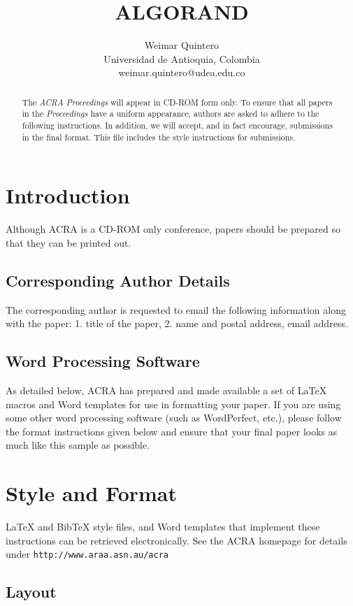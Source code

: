 \documentclass{article}
\title{ALGORAND}
\author{Weimar Quintero \\ Universidad de Antioquia, Colombia \\ 
weimar.quintero@udea.edu.co}
\begin{document}
\maketitle

\begin{abstract}
The {\it ACRA Proceedings} will appear in CD-ROM form only.
To ensure that all papers in the {\it Proceedings} have a
uniform appearance, authors are asked to adhere to the following
instructions. In addition, we will accept, and in fact encourage, 
submissions in the final format. This file includes the style instructions 
for submissions.
\end{abstract}

\section{Introduction}

Although ACRA is a CD-ROM only conference, papers should be prepared so that
they can be printed out. 

\subsection{Corresponding Author Details} 
The corresponding author is requested to email the following
information along with the paper: 1. title of the paper, 
2. name and postal address, email address.

\subsection{Word Processing Software}

As detailed below, ACRA has prepared and made available a set of
\LaTeX{} macros and Word templates for use in formatting your paper.
If you are using some other word processing software (such as
WordPerfect, etc.), please follow the format instructions given below
and ensure that your final paper looks as much like this sample as
possible.

\section{Style and Format}

\LaTeX{} and Bib\TeX{} style files, and Word templates that implement these 
instructions can be retrieved electronically.  See the ACRA homepage for 
details under
\verb+http://www.araa.asn.au/acra+

\subsection{Layout}
\end{document}
